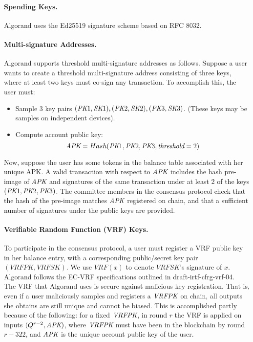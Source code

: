 \documentclass[../main.tex]{subfiles}
\begin{document}
\paragraph{Spending Keys.}

Algorand uses the Ed25519 signature scheme based on RFC 8032. 

\paragraph{Multi-signature Addresses.} 

Algorand supports threshold multi-signature addresses as follows. 
Suppose a user wants to create a threshold multi-signature address consisting of three keys, where at least two keys 
must co-sign any transaction. To accomplish this, the user must: 
\begin{itemize}
\item Sample 3 key pairs $(\textit{PK}1, \textit{SK}1), (\textit{PK}2, \textit{SK}2), (\textit{PK}3, \textit{SK}3)$. (These keys may be samples on independent devices).
\item Compute account public key: 
\[
\textit{APK} = Hash(\textit{PK}1, \textit{PK}2, \textit{PK}3, \textit{threshold}=2)
\]
\end{itemize}

Now, suppose the user has some tokens in the balance table associated with her unique APK. 
A valid transaction with respect to $\textit{APK}$ includes the hash pre-image of $\textit{APK}$ and signatures of the same transaction under at least 2 of the keys $(\textit{PK}1, \textit{PK}2, \textit{PK}3)$. 
The committee members in the consensus protocol check that the hash of the pre-image matches $\textit{APK}$ registered on chain, 
and that a sufficient number of signatures under the public keys are provided. 

\paragraph{Verifiable Random Function (VRF) Keys.} 

To participate in the consensus protocol, a user must register a VRF public key in her balance entry, with a corresponding public/secret key pair $(VRFPK,VRFSK)$. We use $VRF(x)$ to denote $VRFSK$'s signature of $x$.
Algorand follows the EC-VRF specifications outlined in draft-irtf-cfrg-vrf-04.\\

The VRF that Algorand uses is secure against malicious key registration. 
That is, even if a user maliciously samples and registers a $\textit{VRFPK}$ on chain, all outputs she obtains are still unique and cannot be biased.
This is accomplished partly because of the following: 
for a fixed $\textit{VRFPK}$, in round $r$ the VRF is applied on inputs $(Q^{r-2}, \textit{APK})$, where $\textit{VRFPK}$ must have been in the blockchain by round $r-322$, and $\textit{APK}$ is the unique account public key of the user.
\end{document}
